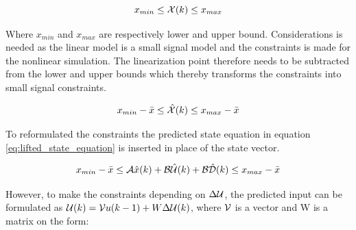 \begin{equation}
    x_{min} \leq \CMcal{X}(k) \leq x_{max}
\end{equation}

Where $x_{min}$ and $x_{max}$ are respectively lower and upper bound. Considerations is needed as the linear model is a small signal model and the constraints is made for the nonlinear simulation. The linearization point therefore needs to be subtracted from the lower and upper bounds which thereby transforms the constraints into small signal constraints.


\begin{equation}
    x_{min}- \bar{x} \leq \hat{\CMcal{X}}(k) \leq x_{max}-\bar{x}
\end{equation}

To reformulated the constraints the predicted state equation in equation \ref{eq:lifted_state_equation} is inserted in place of the state vector.

\begin{equation}\label{eq:constraint_states}
	x_{min}- \bar{x} \leq \CMcal{A}\hat{x}(k)+\CMcal{B}\hat{\CMcal{U}}(k)+\CMcal{B\hat{D}}(k) \leq x_{max}-\bar{x}
 \end{equation} 

However, to make the constraints depending on $\Delta \CMcal{U}$, the predicted input can be formulated as $\CMcal{U}(k) = \CMcal{V}u(k-1) +W\Delta \CMcal{U}(k) $, where $\CMcal{V}$ is a vector and W is a matrix on the form: 

